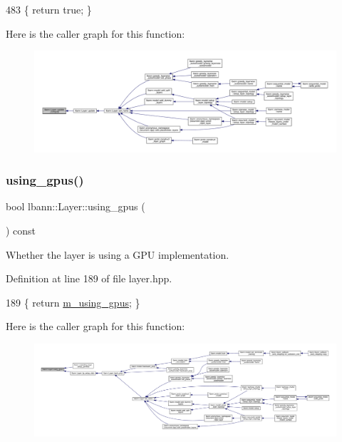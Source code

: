 \begin{DoxyCode}
483 \{ \textcolor{keywordflow}{return} \textcolor{keyword}{true}; \}
\end{DoxyCode}
Here is the caller graph for this function\+:\nopagebreak
\begin{figure}[H]
\begin{center}
\leavevmode
\includegraphics[width=350pt]{classlbann_1_1Layer_a70e08fc96a612f67ade6ba3809536d85_icgraph}
\end{center}
\end{figure}
\mbox{\label{classlbann_1_1Layer_a6a75532bdaa2ca3879034f2a76085a06}} 
\subsubsection{\texorpdfstring{using\+\_\+gpus()}{using\_gpus()}}
{\footnotesize\ttfamily bool lbann\+::\+Layer\+::using\+\_\+gpus (\begin{DoxyParamCaption}{ }\end{DoxyParamCaption}) const\hspace{0.3cm}{\ttfamily [inline]}}

Whether the layer is using a G\+PU implementation. 

Definition at line 189 of file layer.\+hpp.


\begin{DoxyCode}
189 \{ \textcolor{keywordflow}{return} \hyperlink{classlbann_1_1Layer_af7881cb5eff5207c15fa835d65462e8f}{m\_using\_gpus}; \}
\end{DoxyCode}
Here is the caller graph for this function\+:\nopagebreak
\begin{figure}[H]
\begin{center}
\leavevmode
\includegraphics[width=350pt]{classlbann_1_1Layer_a6a75532bdaa2ca3879034f2a76085a06_icgraph}
\end{center}
\end{figure}
\mbox{\label{classlbann_1_1Layer_ab94eb4ac28bac0c472a1da83ade4adf1}} 
